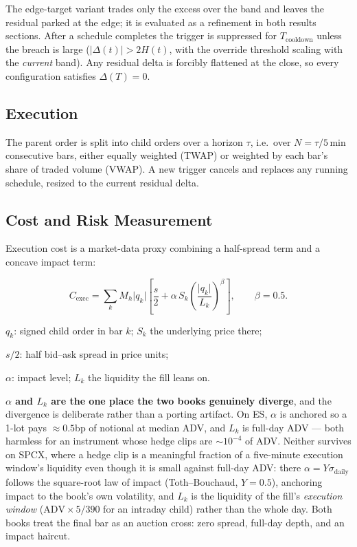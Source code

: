 \documentclass{article}
\begin{document}
The edge-target variant trades only the excess over the band and leaves the residual
parked at the edge; it is evaluated as a refinement in both results sections. After a
schedule completes the trigger is suppressed for $T_{\text{cooldown}}$ unless the breach
is large ($\lvert\Delta(t)\rvert > 2H(t)$, with the override threshold scaling with the
\emph{current} band). Any residual delta is forcibly flattened at the close, so every
configuration satisfies $\Delta(T) = 0$.

\subsection{Execution}

The parent order is split into child orders over a horizon $\tau$, i.e.\ over
$N = \tau/5\,\text{min}$ consecutive bars, either equally weighted (TWAP) or weighted by
each bar's share of traded volume (VWAP). A new trigger cancels and replaces any running
schedule, resized to the current residual delta.

\subsection{Cost and Risk Measurement}

Execution cost is a market-data proxy combining a half-spread term and a concave impact
term:

\begin{eqbox}
\begin{equation}
C_{\text{exec}} = \sum_k M_h \lvert q_k \rvert
\left[ \frac{s}{2} + \alpha\,S_k \left( \frac{\lvert q_k \rvert}{L_k} \right)^{\!\beta} \right],
\qquad \beta = 0.5 .
\label{eq:cost}
\end{equation}
\end{eqbox}

\begin{vardefs}
\item $q_k$: signed child order in bar $k$; $S_k$ the underlying price there;
\item $s/2$: half bid--ask spread in price units;
\item $\alpha$: impact level; $L_k$ the liquidity the fill leans on.
\end{vardefs}

\textbf{$\alpha$ and $L_k$ are the one place the two books genuinely diverge}, and the
divergence is deliberate rather than a porting artifact. On ES, $\alpha$ is anchored so a
1-lot pays $\approx0.5$bp of notional at median ADV, and $L_k$ is full-day ADV --- both
harmless for an instrument whose hedge clips are $\sim\!10^{-4}$ of ADV. Neither survives
on SPCX, where a hedge clip is a meaningful fraction of a five-minute execution window's
liquidity even though it is small against full-day ADV: there $\alpha = Y\sigma_{\text{daily}}$
follows the square-root law of impact (Toth--Bouchaud, $Y = 0.5$), anchoring impact to the
book's own volatility, and $L_k$ is the liquidity of the fill's \emph{execution window}
($\text{ADV}\times 5/390$ for an intraday child) rather than the whole day. Both books
treat the final bar as an auction cross: zero spread, full-day depth, and an impact
haircut.
\end{document}
